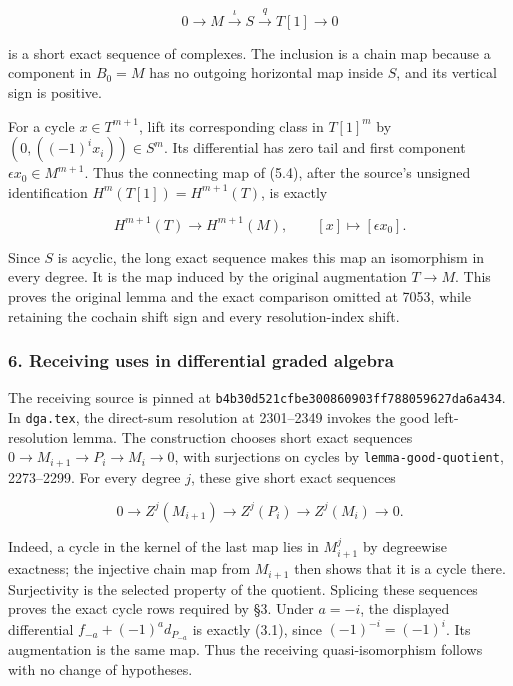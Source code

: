 \[
0\longrightarrow M\xrightarrow{\iota}S\xrightarrow{q}T[1]
\longrightarrow0                                      \tag{5.4}
\]

is a short exact sequence of complexes. The inclusion is a chain map because a component in \(B_0=M\) has no outgoing horizontal map inside \(S\), and its vertical sign is positive.

For a cycle \(x\in T^{m+1}\), lift its corresponding class in \(T[1]^m\) by \((0,((-1)^ix_i))\in S^m\). Its differential has zero tail and first component \(\epsilon x_0\in M^{m+1}\). Thus the connecting map of (5.4), after the source's unsigned identification \(H^m(T[1])=H^{m+1}(T)\), is exactly

\[
H^{m+1}(T)\longrightarrow H^{m+1}(M),\qquad
[x]\longmapsto[\epsilon x_0].
\]

Since \(S\) is acyclic, the long exact sequence makes this map an isomorphism in every degree. It is the map induced by the original augmentation \(T\to M\). This proves the original lemma and the exact comparison omitted at 7053, while retaining the cochain shift sign and every resolution-index shift.

\subsubsection{6. Receiving uses in differential graded algebra}\label{receiving-uses-in-differential-graded-algebra}

The receiving source is pinned at \texttt{b4b30d521cfbe300860903ff788059627da6a434}. In \texttt{dga.tex}, the direct-sum resolution at 2301--2349 invokes the good left-resolution lemma. The construction chooses short exact sequences \(0\to M_{i+1}\to P_i\to M_i\to0\), with surjections on cycles by \texttt{lemma-good-quotient}, 2273--2299. For every degree \(j\), these give short exact sequences

\[
0\to Z^j(M_{i+1})\to Z^j(P_i)\to Z^j(M_i)\to0.
\]

Indeed, a cycle in the kernel of the last map lies in \(M_{i+1}^j\) by degreewise exactness; the injective chain map from \(M_{i+1}\) then shows that it is a cycle there. Surjectivity is the selected property of the quotient. Splicing these sequences proves the exact cycle rows required by §3. Under \(a=-i\), the displayed differential \(f_{-a}+(-1)^a d_{P_{-a}}\) is exactly (3.1), since \((-1)^{-i}=(-1)^i\). Its augmentation is the same map. Thus the receiving quasi-isomorphism follows with no change of hypotheses.

